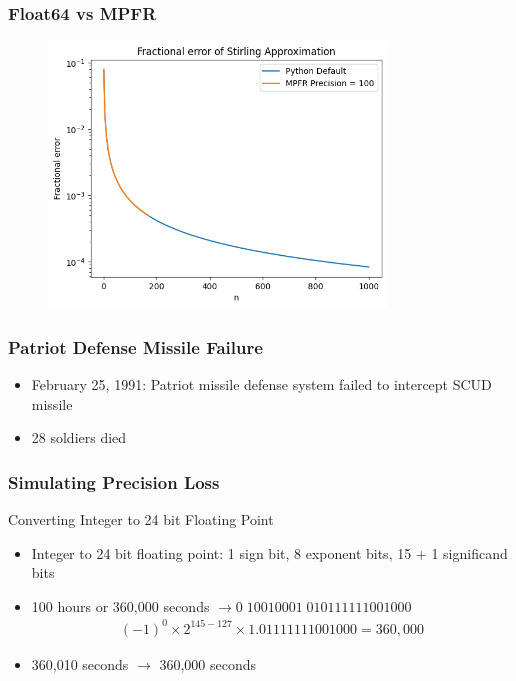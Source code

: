 \documentclass[10pt]{beamer}
\begin{document}
\begin{frame}
    \frametitle{Float64 vs MPFR}
    \begin{figure}
        \centering
        \includegraphics[width=0.8\textwidth]{fractional_error.png}
    \end{figure}
\end{frame}

\begin{frame}
    \frametitle{Patriot Defense Missile Failure}
    \begin{itemize}
        \item February 25, 1991: Patriot missile defense system failed to intercept SCUD missile
        \item 28 soldiers died
    \end{itemize}
\end{frame}

\begin{frame}
    \frametitle{Simulating Precision Loss}
    Converting Integer to 24 bit Floating Point
    \begin{itemize}
        \item Integer to 24 bit floating point: 1 sign bit, 8 exponent bits, 15 + 1 significand bits
        \item 100 hours or 360,000 seconds $\to 0\;10010001\; 010111111001000$
        \begin{align*}
            (-1)^0 \times 2^{145 - 127} \times 1.01111111001000 = 360,000
        \end{align*}
        \item 360,010 seconds $\to$ 360,000 seconds
    \end{itemize}
\end{frame}
\end{document}

